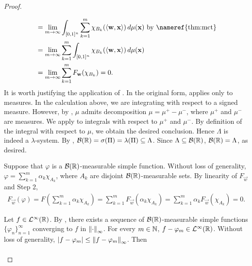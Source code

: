 \begin{proof}
\begin{step}
\begin{align*}
               &=  \lim_{m \to \infty}\int_{[0,1]^n} \sum_{k=1}^m \chi_{B_k} ( \langle \vec{w}, \vec{x} \rangle  ) \, d \mu  (\vec{x})  \text{ by \nameref{thm:mct}}  \\
               &= \lim_{m \to \infty} \sum_{k=1}^m \int_{[0,1]^n} \chi_{B_k}  ( \langle \vec{w}, \vec{x} \rangle  ) \, d \mu  (\vec{x}) \\ 
               &=  \lim_{m \to \infty} \sum_{k=1}^m F_{\vec{w}}(\chi_{B_k}) = 0.
\end{align*}
It is worth justifying the application of . In the original form,  applies only to measures. In the calculation above, we are integrating with respect to a signed measure. However, by , $\mu$ admits decomposition $\mu = \mu^{+} - \mu^{-}$, where $\mu^{+}$ and $\mu^{-}$ are measures. We apply  to integrals with respect to $\mu^{+}$ and $\mu^{-}$. By definition of the integral with respect to $\mu$, we obtain the desired conclusion.
Hence $\Lambda$ is indeed a $\lambda$-system. By , ${\mathcal B}({\mathbb R}) = \sigma(\Pi) = \lambda(\Pi) \subseteq \Lambda$.
Since $\Lambda \subseteq {\mathcal B}({\mathbb R})$, ${\mathcal B}({\mathbb R}) = \Lambda$, as desired.
\end{step}
\begin{step}
Suppose that $\varphi$ is a ${\mathcal B}({\mathbb R})$-measurable simple function. Without loss of generality, $\varphi = \sum_{k=1}^m \alpha_k \chi_{A_k} $, where $A_k$ are disjoint ${\mathcal B}({\mathbb R})$-measurable sets. By linearity of $F_\vec{w}$ and Step 2,
\begin{align}
    \label{ineqn:discrim:vanishdiscrimlemma:simple}
    F_{\vec{w}}(\varphi) = F \left (\sum_{k=1}^m \alpha_k \chi_{A_k} \right ) = \sum_{k=1}^m F_{\vec{w}}(\alpha_k \chi_{A_k}) =  \sum_{k=1}^m  \alpha_k F_{\vec{w}}( \chi_{A_k}) = 0.
\end{align}
\end{step}
\begin{step}
Let $f \in {\mathcal {L}^\infty}({\mathbb R})$. By , there exists a sequence of ${\mathcal B}({\mathbb R})$-measurable simple functions $\{ \varphi_n \}_{n=1}^\infty$ converging to $f$ in $\left\lVert\cdot\right\rVert_\infty$. For every $m \in {\mathbb N}$, $f - \varphi_m \in {\mathcal {L}^\infty}({\mathbb R})$. Without loss of generality, $| f - \varphi_m | \leq \left\lVert f - \varphi_m\right\rVert_\infty$. Then
\begin{subequations}\label{ineqn:discrim:vanishdiscrimlemma:vanish_goal}
\begin{align*}

\end{align*}
\end{subequations}
\end{step}
\end{proof}
